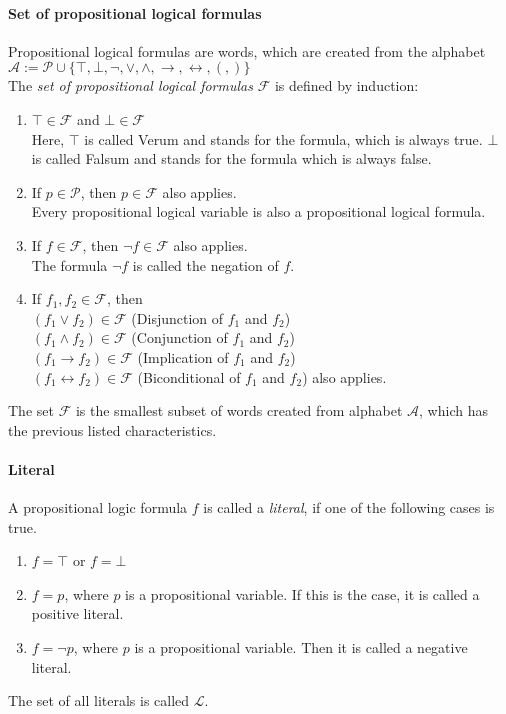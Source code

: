 \paragraph{Set of propositional logical formulas}
Propositional logical formulas are words, which are created from the alphabet $\mathcal{A}:= \mathcal{P} \cup \{\top,\bot,\neg,\vee,\land,\rightarrow,\leftrightarrow,(,)\}$ \\
The \emph{set of propositional logical formulas} $\mathcal{F}$ is defined by induction: 
\begin{enumerate}
  \item $\top \in \mathcal{F}$ and $\bot \in \mathcal{F}$ \\
  Here, $\top$ is called Verum and stands for the formula, which is always true. $\bot$ is called Falsum and stands for the formula which is always false.
  \item If $p \in \mathcal{P}$, then $p \in \mathcal{F}$ also applies. \\
  Every propositional logical variable is also a propositional logical formula.
  \item If $f \in \mathcal{F}$, then $\neg f \in \mathcal{F}$ also applies. \\
  The formula $\neg f$ is called the negation of $f$.
  \item If $f_1, f_2 \in \mathcal{F}$, then \\
  $(f_1 \vee f_2) \in \mathcal{F}$ (Disjunction of $f_1$ and $f_2$) \\
  $(f_1 \land f_2) \in \mathcal{F}$ (Conjunction of $f_1$ and $f_2$) \\
  $(f_1 \rightarrow f_2) \in \mathcal{F}$ (Implication of $f_1$ and $f_2$) \\
  $(f_1 \leftrightarrow f_2) \in \mathcal{F}$ (Biconditional of $f_1$ and $f_2$)
  also applies.
\end{enumerate}
The set $\mathcal{F}$ is the smallest subset of words created from alphabet $\mathcal{A}$, which has the previous listed characteristics.

\paragraph{Literal}
A propositional logic formula $f$ is called a \emph{literal}, if one of the following cases is true.
\begin{enumerate}
  \item $f = \top$ or $f = \bot$
  \item $f = p$, where $p$ is a propositional variable. If this is the case, it is called a positive literal.
  \item $f = \neg p$, where $p$ is a propositional variable. Then it is called a negative literal.
\end{enumerate}
The set of all literals is called $\mathcal{L}$.

